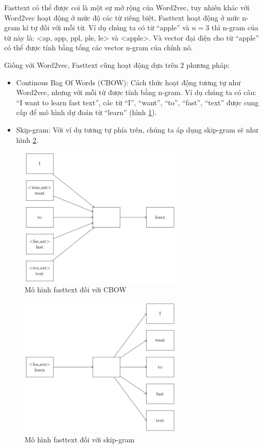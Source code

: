 Fasttext có thể được coi là một sự mở rộng của Word2vec, tuy nhiên khác với Word2vec hoạt động ở mức độ các từ riêng biệt, Fasttext hoạt động ở mức n-gram kí tự đối với mỗi từ. Ví dụ chúng ta có từ ``apple'' và $n = 3$ thì n-gram của từ này là: <ap, app, ppl, ple, le> và <apple>. Và vector đại diện cho từ ``apple'' có thể được tính bằng tổng các vector n-gram của chính nó.

Giống với Word2vec, Fasttext cũng hoạt động dựa trên 2 phương pháp:
\begin{itemize}
    \item Continous Bag Of Words (CBOW): Cách thức hoạt động tương tự như Word2vec, nhưng với mỗi từ được tính bằng n-gram. Ví dụ chúng ta có câu: ``I want to learn fast text'', các từ ``I'', ``want'', ``to'', ``fast'', ``text'' được cung cấp để mô hình dự đoán từ ``learn'' (hình \ref{figure:fasttext-cbow}).
    \item Skip-gram: Với ví dụ tương tự phía trên, chúng ta áp dụng skip-gram sẽ như hình \ref{figure:fasttext-skip-gram}.
\end{itemize}
\begin{figure}[htb!]
    \centering
    \includegraphics[width=0.7\textwidth]{tikz_image/fasttext_cbow.pdf}
    \caption{Mô hình fasttext đối với CBOW \cite{webpage14}}
    \label{figure:fasttext-cbow}
\end{figure}
\begin{figure}[htb!]
    \centering
    \includegraphics[width=0.7\textwidth]{tikz_image/fasttext_skipgram.pdf}
    \caption{Mô hình fasttext đối với skip-gram \cite{webpage14}}
    \label{figure:fasttext-skip-gram}
\end{figure}
